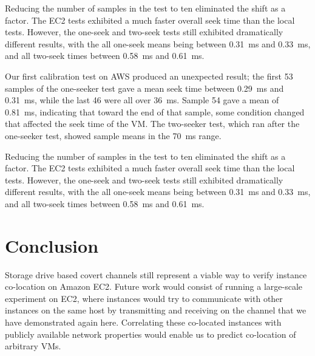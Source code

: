 \documentclass[conference]{IEEEtran}
\begin{document}
Reducing the number of samples in the test to ten eliminated the shift as a factor.
The EC2 tests exhibited a much faster overall seek time than the local tests.
However, the one-seek and two-seek tests still exhibited dramatically different results, with the all one-seek means
  being between \SI{0.31}{ms} and \SI{0.33}{ms}, and all two-seek times between \SI{0.58}{ms} and \SI{0.61}{ms}.

Our first calibration test on AWS produced an unexpected result; the first \num{53} samples of the one-seeker test gave
  a mean seek time between \SI{0.29}{ms} and \SI{0.31}{ms}, while the last \num{46} were all over \SI{36}{ms}.
Sample \num{54} gave a mean of \SI{0.81}{ms}, indicating that toward the end of that sample, some condition changed
  that affected the seek time of the VM.
The two-seeker test, which ran after the one-seeker test, showed sample means in the \SI{70}{ms} range.

Reducing the number of samples in the test to ten eliminated the shift as a factor.
The EC2 tests exhibited a much faster overall seek time than the local tests.
However, the one-seek and two-seek tests still exhibited dramatically different results, with the all one-seek means
  being between \SI{0.31}{ms} and \SI{0.33}{ms}, and all two-seek times between \SI{0.58}{ms} and \SI{0.61}{ms}.

\section{Conclusion}
Storage drive based covert channels still represent a viable way to verify instance co-location on Amazon EC2.
Future work would consist of running a large-scale experiment on EC2, where instances would try to communicate with
  other instances on the same host by transmitting and receiving on the channel that we have demonstrated again here.
Correlating these co-located instances with publicly available network properties would enable us to predict
  co-location of arbitrary VMs.




\end{document}
